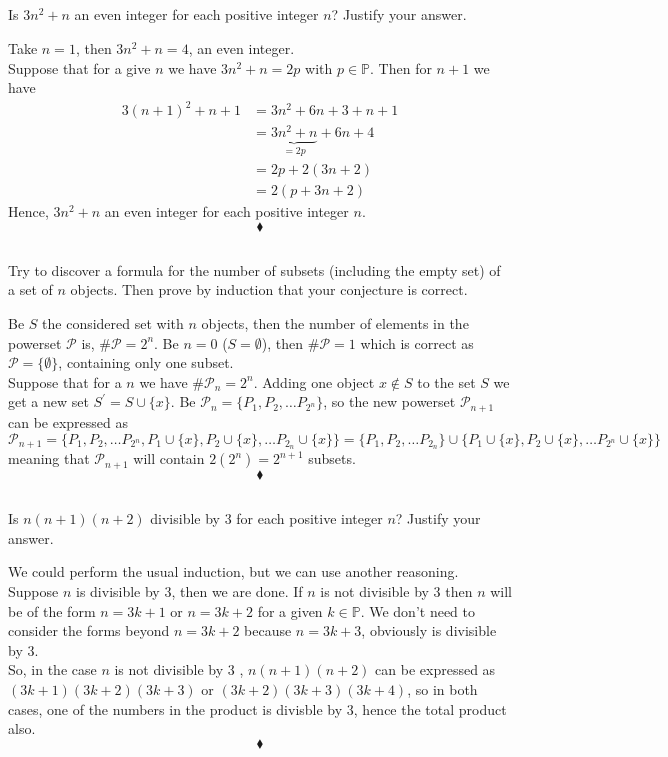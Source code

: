 \subsection{}
\begin{tcolorbox}
Is $3n^2+ n$ an even integer for each positive integer $n$? Justify your answer.
\end{tcolorbox}
$$ $$
Take $n=1$, then $3n^2+ n= 4$, an even integer.\\
Suppose that for a give $n$ we have $3n^2+ n= 2p$ with $p\in \mathbb{P}$. Then for $n+1$ we have
 \begin{align*}
3(n+1)^2+ n+1 &= 3n^2+6n + 3 + n+1\\
&= \underbrace{3n^2+ n}_{=2p} +6n + 4\\
&= 2p +2(3n + 2)\\
&= 2(p +3n + 2)
\end{align*}
Hence, $3n^2+ n$ an even integer for each positive integer $n$.
$$\blacklozenge$$


\subsection{}
\begin{tcolorbox}
Try to discover a formula for the number of subsets (including the empty set) of a set of $n$ objects. Then prove by induction that your conjecture is correct. 
\end{tcolorbox}
$$ $$
Be $S$ the considered set with $n$ objects, then the number of elements in the powerset $\mathscr{P}$ is,  $\#\mathscr{P}=2^n$.
Be $n=0$ ($S=\emptyset$), then $\#\mathscr{P}=1$ which is correct as $\mathscr{P}=\{\emptyset\}$, containing only one subset.\\
Suppose that for a $n$ we have $\#\mathscr{P}_n=2^n$. Adding one object $x\not\in S $ to the set $S$ we get a new set $S^{'} = S\cup \{x\}$. Be $\mathscr{P}_n=\{P_1, P_2,\dots P_{2^n}\}$, so the new powerset $\mathscr{P}_{n+1}$ can be expressed as 
$\mathscr{P}_{n+1}=\{P_1, P_2,\dots P_{2^n},P_1\cup \{x\}, P_2\cup \{x\},\dots P_{2_n}\cup \{x\}\}=\{P_1, P_2,\dots P_{2_n}\}\cup \{P_1\cup \{x\}, P_2\cup \{x\},\dots P_{2^n}\cup \{x\}\} $
meaning that $\mathscr{P}_{n+1}$ will contain $2(2^{n})=2^{n+1} $ subsets. 
$$\blacklozenge$$
\subsection{}
\begin{tcolorbox}
Is $n(n + 1)(n + 2)$ divisible by $3$ for each positive integer $n$? Justify your answer. 
\end{tcolorbox}
$$ $$
We could perform the usual induction, but we can use another reasoning. \\
Suppose $n$ is divisible by $3$, then we are done. If $n$ is not divisible by $3$ then $n$ will be of the form $n=3k+1$ or  $n=3k+2$ for a given $k\in \mathbb{P}$. We don't need to consider the forms beyond $n=3k+2$ because $n=3k+3$, obviously is divisible by $3$.\\
So, in the case $n$ is not divisible by $3$ , $n(n + 1)(n + 2)$ can be expressed as $(3k+1)(3k+2)(3k+3)$ or $(3k+2)(3k+3)(3k+4)$, so in  both cases, one of the numbers in the product is divisble by $3$, hence the total product also.
$$\blacklozenge$$
